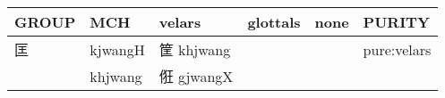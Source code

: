 \documentclass[14pt,a4paper]{scrartcl}
\begin{document}
\begin{longtable}[c]{@{}llllll@{}}
\toprule
\begin{minipage}[b]{0.14\columnwidth}\raggedright\strut
GROUP
\strut\end{minipage} &
\begin{minipage}[b]{0.14\columnwidth}\raggedright\strut
MCH
\strut\end{minipage} &
\begin{minipage}[b]{0.14\columnwidth}\raggedright\strut
velars
\strut\end{minipage} &
\begin{minipage}[b]{0.14\columnwidth}\raggedright\strut
glottals
\strut\end{minipage} &
\begin{minipage}[b]{0.14\columnwidth}\raggedright\strut
none
\strut\end{minipage} &
\begin{minipage}[b]{0.14\columnwidth}\raggedright\strut
PURITY
\strut\end{minipage}\tabularnewline
\midrule
\endhead
\begin{minipage}[t]{0.14\columnwidth}\raggedright\strut
匡
\strut\end{minipage} &
\begin{minipage}[t]{0.14\columnwidth}\raggedright\strut
kjwangH
\strut\end{minipage} &
\begin{minipage}[t]{0.14\columnwidth}\raggedright\strut
筐 khjwang
\strut\end{minipage} &
\begin{minipage}[t]{0.14\columnwidth}\raggedright\strut
\strut\end{minipage} &
\begin{minipage}[t]{0.14\columnwidth}\raggedright\strut
\strut\end{minipage} &
\begin{minipage}[t]{0.14\columnwidth}\raggedright\strut
pure:velars
\strut\end{minipage}\tabularnewline
\begin{minipage}[t]{0.14\columnwidth}\raggedright\strut
𤝵
\strut\end{minipage} &
\begin{minipage}[t]{0.14\columnwidth}\raggedright\strut
khjwang
\strut\end{minipage} &
\begin{minipage}[t]{0.14\columnwidth}\raggedright\strut
俇 gjwangX
\strut\end{minipage} &

\end{longtable}
\end{document}
